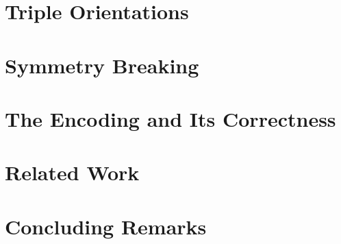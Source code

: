 \documentclass[a4paper, USenglish, cleveref, autoref, thm-restate]{lipics-v2021}
\begin{document}
\section{Triple Orientations}\label{sec:triple-orientations}


% 

\section{Symmetry Breaking}\label{sec:symmetry-breaking}

\section{The Encoding and Its Correctness}\label{sec:encoding}


% 

\section{Related Work}\label{sec:related-work}


\section{Concluding Remarks}\label{sec:conclusions}



\end{document}
